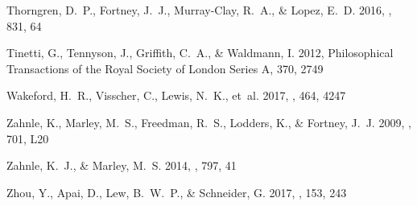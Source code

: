 \documentclass[twocolumn, trackchanges]{aastex61}
\begin{document}
\begin{thebibliography}{}
{Thorngren}, D.~P., {Fortney}, J.~J., {Murray-Clay}, R.~A., \& {Lopez}, E.~D.
  2016, \apj, 831, 64

{Tinetti}, G., {Tennyson}, J., {Griffith}, C.~A., \& {Waldmann}, I. 2012,
  Philosophical Transactions of the Royal Society of London Series A, 370, 2749

{Wakeford}, H.~R., {Visscher}, C., {Lewis}, N.~K., {et~al.} 2017, \mnras, 464,
  4247

{Zahnle}, K., {Marley}, M.~S., {Freedman}, R.~S., {Lodders}, K., \& {Fortney},
  J.~J. 2009, \apjl, 701, L20

{Zahnle}, K.~J., \& {Marley}, M.~S. 2014, \apj, 797, 41

{Zhou}, Y., {Apai}, D., {Lew}, B.~W.~P., \& {Schneider}, G. 2017, \aj, 153, 243

\end{thebibliography}
\end{document}

